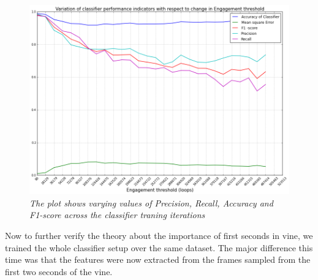 \begin{figure}[!htb]
\centering
\includegraphics[width=\columnwidth]{plots/EngagementClassifierPerf}
\caption{\textsl{ The plot shows varying values of Precision, Recall, Accuracy and F1-score across the classifier traning iterations}}
\label{fig:Classifier_performance}
\end{figure}
 
Now to further verify the theory about the importance of first seconds in vine, we trained the whole classifier setup over the same dataset. The major difference this time was that the features were now extracted from the frames sampled from the first two seconds of the vine. 